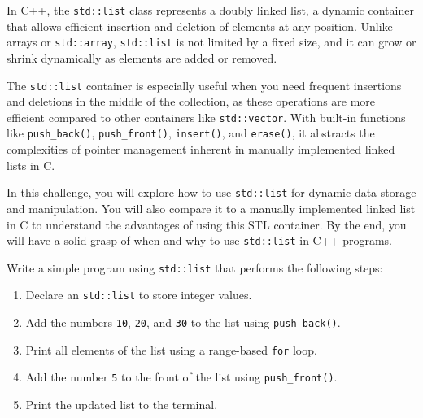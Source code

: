 \begin{challenge}
    \begin{chadescription}
    In C++, the \texttt{std::list} class represents a doubly linked list, a dynamic container that allows efficient insertion and deletion of elements at any position. 
    Unlike arrays or \texttt{std::array}, \texttt{std::list} is not limited by a fixed size, and it can grow or shrink dynamically as elements are added or removed.

    The \texttt{std::list} container is especially useful when you need frequent insertions and deletions in the middle of the collection, as these operations are more efficient compared to other containers like \texttt{std::vector}. 
    With built-in functions like \texttt{push_back()}, \texttt{push_front()}, \texttt{insert()}, and \texttt{erase()}, it abstracts the complexities of pointer management inherent in manually implemented linked lists in C. 

    In this challenge, you will explore how to use \texttt{std::list} for dynamic data storage and manipulation. 
    You will also compare it to a manually implemented linked list in C to understand the advantages of using this STL container. 
    By the end, you will have a solid grasp of when and why to use \texttt{std::list} in C++ programs.
    \end{chadescription}

    \begin{task}
        Write a simple program using \texttt{std::list} that performs the following steps:
        \begin{enumerate}
            \item Declare an \texttt{std::list} to store integer values.
            \item Add the numbers \texttt{10}, \texttt{20}, and \texttt{30} to the list using \texttt{push_back()}.
            \item Print all elements of the list using a range-based \texttt{for} loop.
            \item Add the number \texttt{5} to the front of the list using \texttt{push_front()}.
            \item Print the updated list to the terminal.
        \end{enumerate}


\end{task}
\end{challenge}
